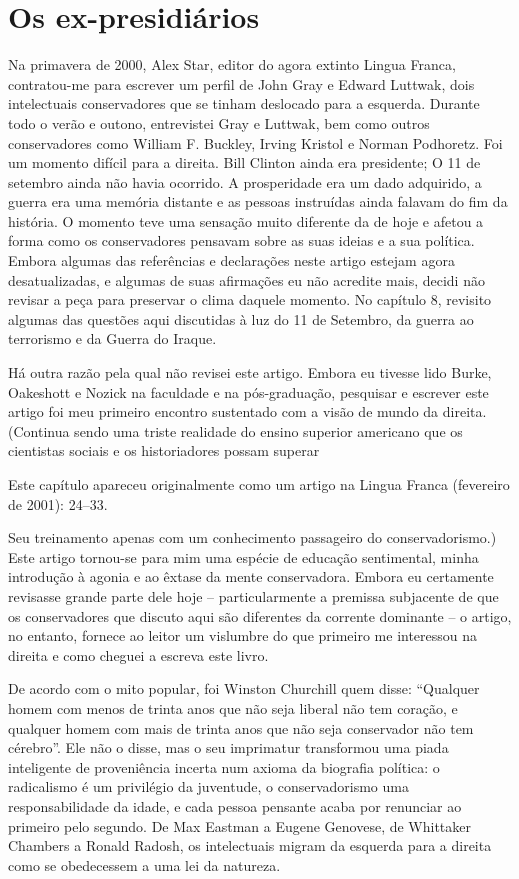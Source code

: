 \chapter{Os ex-presidiários}\label{Os ex-presidiários}
 \par 
Na primavera de 2000, Alex Star, editor do agora extinto Lingua Franca, contratou-me para escrever um perfil de John Gray e Edward Luttwak, dois intelectuais conservadores que se tinham deslocado para a esquerda. Durante todo o verão e outono, entrevistei Gray e Luttwak, bem como outros conservadores como William F. Buckley, Irving Kristol e Norman Podhoretz. Foi um momento difícil para a direita. Bill Clinton ainda era presidente; O {\color{blue}11} de setembro ainda não havia ocorrido. A prosperidade era um dado adquirido, a guerra era uma memória distante e as pessoas instruídas ainda falavam do fim da história. O momento teve uma sensação muito diferente da de hoje e afetou a forma como os conservadores pensavam sobre as suas ideias e a sua política. Embora algumas das referências e declarações neste artigo estejam agora desatualizadas, e algumas de suas afirmações eu não acredite mais, decidi não revisar a peça para preservar o clima daquele momento. No capítulo 8, revisito algumas das questões aqui discutidas à luz do {\color{blue}11} de Setembro, da guerra ao terrorismo e da Guerra do Iraque.
 \par 
Há outra razão pela qual não revisei este artigo. Embora eu tivesse lido Burke, Oakeshott e Nozick na faculdade e na pós-graduação, pesquisar e escrever este artigo foi meu primeiro encontro sustentado com a visão de mundo da direita. (Continua sendo uma triste realidade do ensino superior americano que os cientistas sociais e os historiadores possam superar
 \par 
Este capítulo apareceu originalmente como um artigo na Lingua Franca (fevereiro de 2001): 24–33.
 \par 
Seu treinamento apenas com um conhecimento passageiro do conservadorismo.) Este artigo tornou-se para mim uma espécie de educação sentimental, minha introdução à agonia e ao êxtase da mente conservadora. Embora eu certamente revisasse grande parte dele hoje – particularmente a premissa subjacente de que os conservadores que discuto aqui são diferentes da corrente dominante – o artigo, no entanto, fornece ao leitor um vislumbre do que primeiro me interessou na direita e como cheguei a escreva este livro.
 \par 
De acordo com o mito popular, foi Winston Churchill quem disse: “Qualquer homem com menos de trinta anos que não seja liberal não tem coração, e qualquer homem com mais de trinta anos que não seja conservador não tem cérebro”. Ele não o disse, mas o seu imprimatur transformou uma piada inteligente de proveniência incerta num axioma da biografia política: o radicalismo é um privilégio da juventude, o conservadorismo uma responsabilidade da idade, e cada pessoa pensante acaba por renunciar ao primeiro pelo segundo. De Max Eastman a Eugene Genovese, de Whittaker Chambers a Ronald Radosh, os intelectuais migram da esquerda para a direita como se obedecessem a uma lei da natureza.
